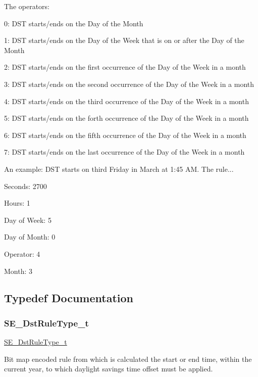 The operators\+:

0\+: D\+ST starts/ends on the Day of the Month

1\+: D\+ST starts/ends on the Day of the Week that is on or after the Day of the Month

2\+: D\+ST starts/ends on the first occurrence of the Day of the Week in a month

3\+: D\+ST starts/ends on the second occurrence of the Day of the Week in a month

4\+: D\+ST starts/ends on the third occurrence of the Day of the Week in a month

5\+: D\+ST starts/ends on the forth occurrence of the Day of the Week in a month

6\+: D\+ST starts/ends on the fifth occurrence of the Day of the Week in a month

7\+: D\+ST starts/ends on the last occurrence of the Day of the Week in a month

An example\+: D\+ST starts on third Friday in March at 1\+:45 AM. The rule...

Seconds\+: 2700

Hours\+: 1

Day of Week\+: 5

Day of Month\+: 0

Operator\+: 4

Month\+: 3 

\subsection{Typedef Documentation}
\mbox{\label{group__DstRuleType_ga215f3da52e2c5be95bc85b60e8702bcf}} 
\subsubsection{\texorpdfstring{S\+E\+\_\+\+Dst\+Rule\+Type\+\_\+t}{SE\_DstRuleType\_t}}
{\footnotesize\ttfamily \hyperlink{group__DstRuleType_ga215f3da52e2c5be95bc85b60e8702bcf}{S\+E\+\_\+\+Dst\+Rule\+Type\+\_\+t}}

Bit map encoded rule from which is calculated the start or end time, within the current year, to which daylight savings time offset must be applied.

